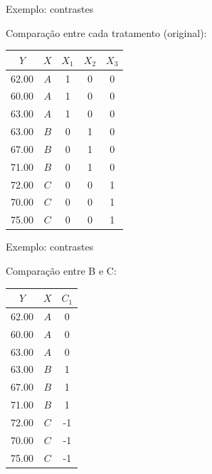 \documentclass{beamer}\usepackage[]{graphicx}\usepackage[]{color}
\begin{document}
\begin{frame}{Exemplo: contrastes}

Comparação entre cada tratamento (original):

\begin{tabular}{cc|ccc}
  \hline
  $Y$ & $X$ & $X_1$ & $X_2$ & $X_3$\\ 
  \hline
  62.00 & $A$ & 1 & 0 & 0\\ 
  60.00 & $A$ & 1 & 0 & 0\\ 
  63.00 & $A$ & 1 & 0 & 0\\ 
  63.00 & $B$ & 0 & 1 & 0\\ 
  67.00 & $B$ & 0 & 1 & 0\\ 
  71.00 & $B$ & 0 & 1 & 0\\ 
  72.00 & $C$ & 0 & 0 & 1\\ 
  70.00 & $C$ & 0 & 0 & 1\\ 
  75.00 & $C$ & 0 & 0 & 1\\ 
  \hline
\end{tabular}

\end{frame}

\begin{frame}{Exemplo: contrastes}

Comparação entre B e C:

\begin{tabular}{cc|c}
  \hline
  $Y$ & $X$ & $C_1$  \\ 
  \hline
  62.00 & $A$ & 0 \\ 
  60.00 & $A$ & 0 \\ 
  63.00 & $A$ & 0 \\ 
  63.00 & $B$ & 1 \\ 
  67.00 & $B$ & 1 \\ 
  71.00 & $B$ & 1 \\ 
  72.00 & $C$ & -1\\ 
  70.00 & $C$ & -1\\ 
  75.00 & $C$ & -1\\ 
  \hline
\end{tabular}

\end{frame}
\end{document}
